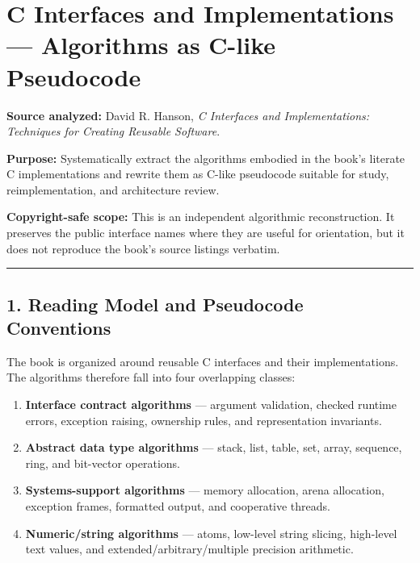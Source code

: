 \documentclass[11pt]{article}
\providecommand{\tightlist}{\setlength{\itemsep}{0pt}\setlength{\parskip}{0pt}}
\begin{document}
\section{C Interfaces and Implementations --- Algorithms as C-like Pseudocode}\label{c-interfaces-and-implementations-algorithms-as-c-like-pseudocode}

\textbf{Source analyzed:} David R. Hanson, \emph{C Interfaces and Implementations: Techniques for Creating Reusable Software}.

\textbf{Purpose:} Systematically extract the algorithms embodied in the book's literate C implementations and rewrite them as C-like pseudocode suitable for study, reimplementation, and architecture review.

\textbf{Copyright-safe scope:} This is an independent algorithmic reconstruction. It preserves the public interface names where they are useful for orientation, but it does not reproduce the book's source listings verbatim.

\begin{center}\rule{0.5\linewidth}{0.5pt}\end{center}

\subsection{1. Reading Model and Pseudocode Conventions}\label{reading-model-and-pseudocode-conventions}

The book is organized around reusable C interfaces and their implementations. The algorithms therefore fall into four overlapping classes:

\begin{enumerate}
\def\labelenumi{\arabic{enumi}.}
\tightlist
\item
  \textbf{Interface contract algorithms} --- argument validation, checked runtime errors, exception raising, ownership rules, and representation invariants.
\item
  \textbf{Abstract data type algorithms} --- stack, list, table, set, array, sequence, ring, and bit-vector operations.
\item
  \textbf{Systems-support algorithms} --- memory allocation, arena allocation, exception frames, formatted output, and cooperative threads.
\item
  \textbf{Numeric/string algorithms} --- atoms, low-level string slicing, high-level text values, and extended/arbitrary/multiple precision arithmetic.
\end{enumerate}
\end{document}
